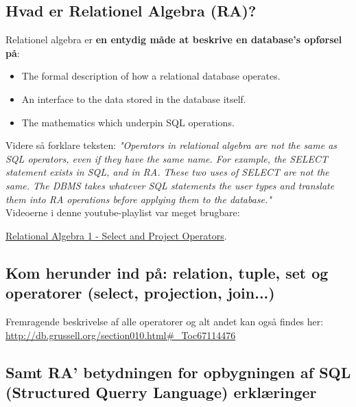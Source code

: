 \newpage

\subsection{Hvad er Relationel Algebra (RA)?}


Relationel algebra er \textbf{en entydig måde at beskrive en database's opførsel på}: 

\begin{itemize}
	\item The formal description of how a relational database operates.
	\item An interface to the data stored in the database itself.
	\item The mathematics which underpin SQL operations.
\end{itemize}

Videre så forklare teksten: \textit{"Operators in relational algebra are not the same as SQL operators, even if they have the same name. For example, the SELECT statement exists in SQL, and in RA. These two uses of SELECT are not the same. The DBMS takes whatever SQL statements the user types and translate them into RA operations before applying them to the database."}\\

Videoerne i denne youtube-playlist var meget brugbare:

\href{https://www.youtube.com/watch?v=yVh_LcOcQdg&list=PL8A52AA7E276200C0&index=1}{Relational Algebra 1 - Select and Project Operators}.

\subsection{Kom herunder ind på: relation, tuple, set og operatorer (select, projection, join...)}

Fremragende beskrivelse af alle operatorer og alt andet kan også findes her: \\
\url{http://db.grussell.org/section010.html#_Toc67114476}








\subsection{Samt RA' betydningen for opbygningen af  SQL (Structured Querry Language) erklæringer}



















